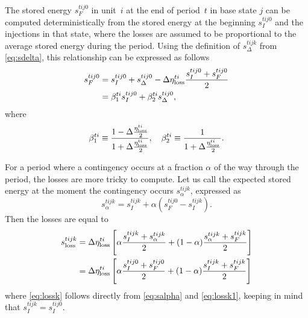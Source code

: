 \documentclass[12pt]{article}
\numberwithin{equation}{section}
\numberwithin{table}{section}
\numberwithin{figure}{section}
\begin{document}
The stored energy $s_F^{tij0}$ in unit~$i$ at the end of period~$t$ in base state $j$ can be computed deterministically from the stored energy at the beginning $s_I^{tij0}$ and the injections in that state, where the losses are assumed to be proportional to the average stored energy during the period. Using the definition of $s_\Delta^{tijk}$ from \eqref{eq:sdelta}, this relationship can be expressed as follows
\begin{align}
s_F^{tij0} &= s_I^{tij0} + s_\Delta^{tij0} - \Delta \eta^{ti}_{\rm loss} \frac{s_I^{tij0}+ s_F^{tij0}}{2} \\
 &= \beta_1^{ti} s_I^{tij0} + \beta_2^{ti} s_\Delta^{tij0}, \label{eq:sf0}
\end{align}
where
\begin{equation}
\beta_1^{ti} \equiv \frac{1 - \Delta \frac{\eta^{ti}_{\rm loss}}{2}}{1 + \Delta \frac{\eta^{ti}_{\rm loss}}{2}}, \quad
\beta_2^{ti} \equiv \frac{1}{1 + \Delta \frac{\eta^{ti}_{\rm loss}}{2}}.
\label{eq:beta1and2} 
\end{equation}

For a period where a contingency occurs at a fraction $\alpha$ of the way through the period, the losses are more tricky to compute. Let us call the expected stored energy at the moment the contingency occurs $s_\alpha^{tijk}$, expressed as
\begin{equation}
s_\alpha^{tijk}  = s_I^{tijk} + \alpha (s_F^{tij0} - s_I^{tijk}). \label{eq:salpha}
\end{equation}
Then the losses are equal to
\begin{align}
s_{\rm loss}^{tijk} &= \Delta \eta^{ti}_{\rm loss} \left[ \alpha \frac{s_I^{tijk} + s_\alpha^{tijk}}{2} + (1-\alpha) \frac{s_\alpha^{tijk} + s_F^{tijk}}{2} \right] \label{eq:lossk1} \\
&= \Delta \eta^{ti}_{\rm loss} \left[ \alpha \frac{s_I^{tij0} + s_F^{tij0}}{2} + (1-\alpha) \frac{s_I^{tijk} + s_F^{tijk}}{2} \right] \label{eq:lossk}
\end{align}
where \eqref{eq:lossk} follows directly from \eqref{eq:salpha} and \eqref{eq:lossk1}, keeping in mind that $s_I^{tijk} = s_I^{tij0}$.
\end{document}
